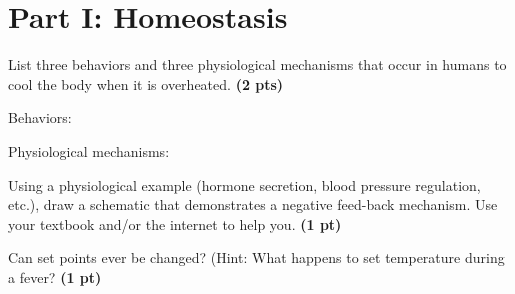 \documentclass[12pt,a4paper]{article}
\begin{document}
\section*{Part I: Homeostasis}
\begin{enumerate}[font=\bfseries, wide]
    {\color{under}\item List three behaviors and three physiological mechanisms that occur in humans to cool the body when it is overheated. \textbf{(2 pts)}}
    \begin{enumerate}[font=\bfseries, wide]
        {\color{under}\item Behaviors:}
        {\color{under}\item Physiological mechanisms:}
    \end{enumerate}
    {\color{under}\item Using a physiological example (hormone secretion, blood pressure regulation, etc.), draw a schematic that demonstrates a negative feed-back mechanism. Use your textbook and/or the internet to help you. \textbf{(1 pt)}}
    
    
    {\color{under}\item Can set points ever be changed? (Hint: What happens to set temperature during a fever? \textbf{(1 pt)}}


\end{enumerate}
\end{document}

